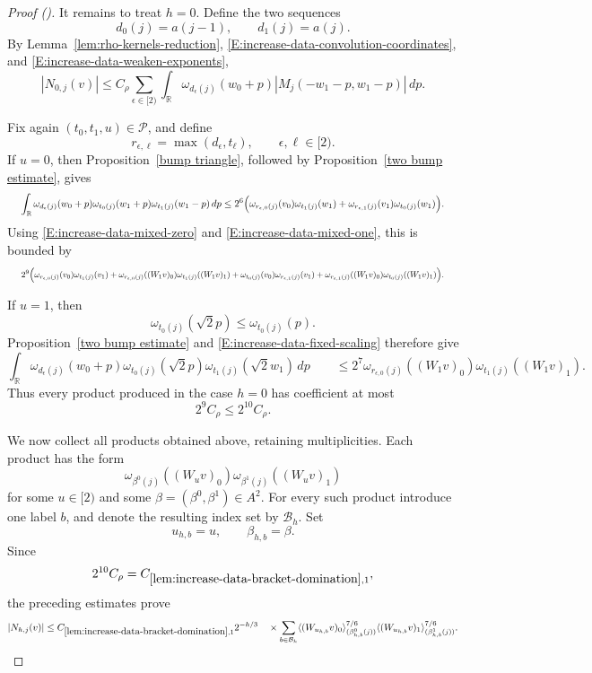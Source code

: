\documentclass[12pt,reqno]{amsart}
\newcommand{\auto}{{({\tiny\faCar})}}
\theoremstyle{plain}
\numberwithin{equation}{section}
\theoremstyle{remark}
\begin{document}
\begin{proof}[Proof \auto]
It remains to treat \(h=0\). Define the two sequences
\[
d_0(j)=a(j-1),
\qquad
d_1(j)=a(j).
\]
By Lemma~\ref{lem:rho-kernels-reduction},
\eqref{E:increase-data-convolution-coordinates}, and
\eqref{E:increase-data-weaken-exponents},
\begin{equation}
    \label{E:increase-data-h-zero-initial}
    |N_{0,j}(v)| \leq C_\rho \sum_{\epsilon\in[2)} \int_{\mathbb R} \omega_{d_\epsilon(j)}(w_0+p) |M_j(-w_1-p,w_1-p)|\,dp.
\end{equation}

Fix again \((t_0,t_1,u)\in\mathcal P\), and define
\[
r_{\epsilon,\ell}
=
\max(d_\epsilon,t_\ell),
\qquad
\epsilon,\ell\in[2).
\]
If \(u=0\), then Proposition~\ref{bump triangle}, followed by
Proposition~\ref{two bump estimate}, gives
\[
\resizebox{0.98\textwidth}{!}{$\displaystyle
\int_{\mathbb R}\omega_{d_\epsilon(j)}(w_0+p)\omega_{t_0(j)}(w_1+p)\omega_{t_1(j)}(w_1-p)\,dp
\leq
2^6\Bigl(\omega_{r_{\epsilon,0}(j)}(v_0)\omega_{t_1(j)}(w_1)
+
\omega_{r_{\epsilon,1}(j)}(v_1)\omega_{t_0(j)}(w_1)\Bigr).$}
\]
Using
\eqref{E:increase-data-mixed-zero} and
\eqref{E:increase-data-mixed-one}, this is bounded by
\begin{equation}
    \label{E:increase-data-h0-u0}
    \resizebox{0.98\textwidth}{!}{$\displaystyle 2^9\Big( \omega_{r_{\epsilon,0}(j)}(v_0) \omega_{t_1(j)}(v_1) + \omega_{r_{\epsilon,0}(j)}((W_1v)_0) \omega_{t_1(j)}((W_1v)_1) + \omega_{t_0(j)}(v_0) \omega_{r_{\epsilon,1}(j)}(v_1) + \omega_{r_{\epsilon,1}(j)}((W_1v)_0) \omega_{t_0(j)}((W_1v)_1) \Big).$}
\end{equation}

If \(u=1\), then
\[
\omega_{t_0(j)}(\sqrt2p)
\leq
\omega_{t_0(j)}(p).
\]
Proposition~\ref{two bump estimate} and
\eqref{E:increase-data-fixed-scaling} therefore give
\begin{equation}
    \label{E:increase-data-h0-u1}
    \int_{\mathbb R} \omega_{d_\epsilon(j)}(w_0+p) \omega_{t_0(j)}(\sqrt2p) \omega_{t_1(j)}(\sqrt2w_1)\,dp \qquad\leq 2^7 \omega_{r_{\epsilon,0}(j)}((W_1v)_0) \omega_{t_1(j)}((W_1v)_1).
\end{equation}
Thus every product produced in the case \(h=0\) has coefficient at
most
\[
2^9C_\rho
\leq
2^{10}C_\rho.
\]

We now collect all products obtained above, retaining
multiplicities. Each product has the form
\[
\omega_{\beta^0(j)}((W_uv)_0)
\omega_{\beta^1(j)}((W_uv)_1)
\]
for some \(u\in[2)\) and some
\(\beta=(\beta^0,\beta^1)\in A^2\).
For every such product introduce one label \(b\), and denote the
resulting index set by \(\mathcal B_h\). Set
\[
u_{h,b}=u,
\qquad
\beta_{h,b}=\beta.
\]
Since
\[
2^{10}C_\rho
=
C_{\ref{lem:increase-data-bracket-domination},1},
\]
the preceding estimates prove
\[
|N_{h,j}(v)| \leq C_{\ref{lem:increase-data-bracket-domination},1} 2^{-h/3} \quad\times \sum_{b\in\mathcal B_h} \langle(W_{u_{h,b}}v)_0 \rangle_{(\beta_{h,b}^0(j))}^{7/6} \langle(W_{u_{h,b}}v)_1 \rangle_{(\beta_{h,b}^1(j))}^{7/6}.
\]


\end{proof}
\end{document}
